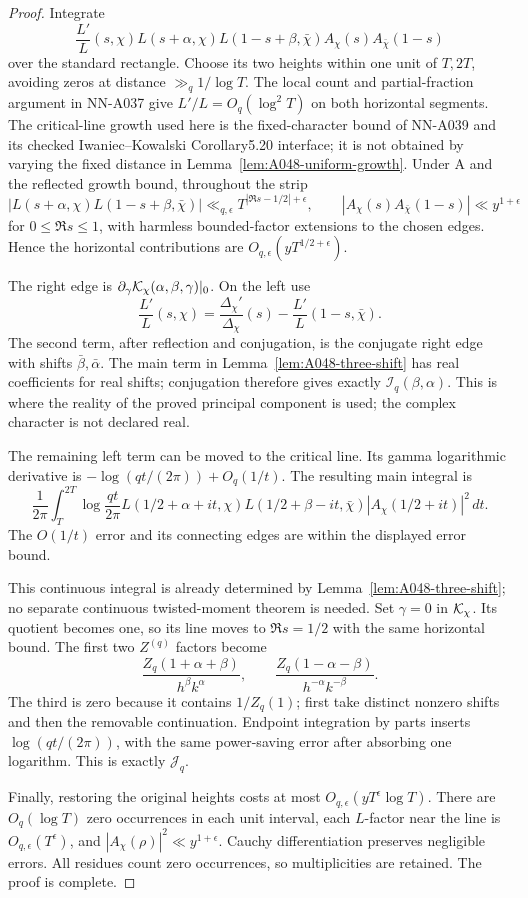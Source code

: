 \begin{proof}
Integrate
\[
 \frac{L'}L(s,\chi)
 L(s+\alpha,\chi)L(1-s+\beta,\bar\chi)
                    A_\chi(s)A_{\bar\chi}(1-s)
\]
over the standard rectangle. Choose its two heights
within one unit of \(T,2T\), avoiding zeros at distance
\(\gg_q1/\log T\). The local count and partial-fraction
argument in NN-A037 give \(L'/L=O_q(\log^2 T)\)
on both horizontal segments. The critical-line growth used
here is the fixed-character bound of NN-A039 and its checked
Iwaniec--Kowalski Corollary5.20 interface; it is not obtained
by varying the fixed distance in Lemma~\ref{lem:A048-uniform-growth}.
Under A and the reflected growth bound, throughout the strip
\[
 |L(s+\alpha,\chi)L(1-s+\beta,\bar\chi)|
             \ll_{q,\epsilon}T^{|\Re s-1/2|+\epsilon},
 \qquad
 |A_\chi(s)A_{\bar\chi}(1-s)|\ll y^{1+\epsilon}
\]
for \(0\le\Re s\le1\), with harmless bounded-factor
extensions to the chosen edges. Hence the horizontal
contributions are \(O_{q,\epsilon}(yT^{1/2+\epsilon})\).

The right edge is
\(\partial_\gamma{\cal K}_\chi(\alpha,\beta,\gamma)|_0\).
On the left use
\[
 \frac{L'}L(s,\chi)
   =\frac{\Delta_\chi'}{\Delta_\chi}(s)
                     -\frac{L'}L(1-s,\bar\chi).
\]
The second term, after reflection and conjugation,
is the conjugate right edge with shifts
\(\bar\beta,\bar\alpha\). The main term in
Lemma~\ref{lem:A048-three-shift} has real coefficients
for real shifts; conjugation therefore gives exactly
\(\mathcal I_q(\beta,\alpha)\). This is where the
reality of the proved principal component is used;
the complex character is not declared real.

The remaining left term can be moved to the critical
line. Its gamma logarithmic derivative is
\(-\log(qt/(2\pi))+O_q(1/t)\). The resulting main
integral is
\[
 \frac1{2\pi}\int_T^{2T}\log\frac{qt}{2\pi}
    L(1/2+\alpha+it,\chi)
    L(1/2+\beta-it,\bar\chi)|A_\chi(1/2+it)|^2\,dt.
\]
The \(O(1/t)\) error and its connecting edges are
within the displayed error bound.

This continuous integral is already determined by
Lemma~\ref{lem:A048-three-shift}; no separate continuous
twisted-moment theorem is needed. Set \(\gamma=0\)
in \({\cal K}_\chi\). Its quotient becomes one,
so its line moves to \(\Re s=1/2\) with the same
horizontal bound. The first two \(Z^{(q)}\) factors
become
\[
 \frac{Z_q(1+\alpha+\beta)}{h^\beta k^\alpha},
 \qquad
 \frac{Z_q(1-\alpha-\beta)}{h^{-\alpha}k^{-\beta}}.
\]
The third is zero because it contains \(1/Z_q(1)\);
first take distinct nonzero shifts and then the
removable continuation. Endpoint integration by
parts inserts \(\log(qt/(2\pi))\), with the same
power-saving error after absorbing one logarithm.
This is exactly \(\mathcal J_q\).

Finally, restoring the original heights costs at most
\(O_{q,\epsilon}(yT^\epsilon\log T)\).
There are \(O_q(\log T)\) zero occurrences in each
unit interval, each \(L\)-factor near the line is
\(O_{q,\epsilon}(T^\epsilon)\), and
\(|A_\chi(\rho)|^2\ll y^{1+\epsilon}\).
Cauchy differentiation preserves negligible errors.
All residues count zero occurrences, so multiplicities
are retained. The proof is complete.
\end{proof}


